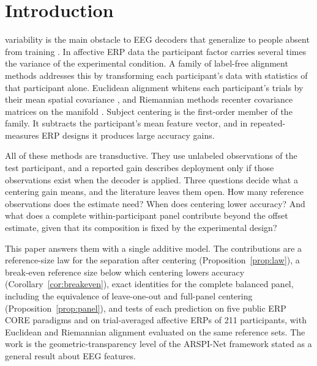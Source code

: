\section{Introduction}
 variability is the main obstacle to EEG decoders that generalize to people absent from training \cite{saha2020variability,wu2022transfer}. In affective ERP data the participant factor carries several times the variance of the experimental condition. A family of label-free alignment methods addresses this by transforming each participant's data with statistics of that participant alone. Euclidean alignment whitens each participant's trials by their mean spatial covariance \cite{he2020ea}, and Riemannian methods recenter covariance matrices on the manifold \cite{zanini2018transfer,rodrigues2019rpa}. Subject centering is the first-order member of the family. It subtracts the participant's mean feature vector, and in repeated-measures ERP designs it produces large accuracy gains.

All of these methods are transductive. They use unlabeled observations of the test participant, and a reported gain describes deployment only if those observations exist when the decoder is applied. Three questions decide what a centering gain means, and the literature leaves them open. How many reference observations does the estimate need? When does centering lower accuracy? And what does a complete within-participant panel contribute beyond the offset estimate, given that its composition is fixed by the experimental design?

This paper answers them with a single additive model. The contributions are a reference-size law for the separation after centering (Proposition~\ref{prop:law}), a break-even reference size below which centering lowers accuracy (Corollary~\ref{cor:breakeven}), exact identities for the complete balanced panel, including the equivalence of leave-one-out and full-panel centering (Proposition~\ref{prop:panel}), and tests of each prediction on five public ERP CORE paradigms \cite{kappenman2021erpcore} and on trial-averaged affective ERPs of 211 participants, with Euclidean and Riemannian alignment evaluated on the same reference sets. The work is the geometric-transparency level of the ARSPI-Net framework \cite{lane2026dissertation,lane2026bibm} stated as a general result about EEG features.
